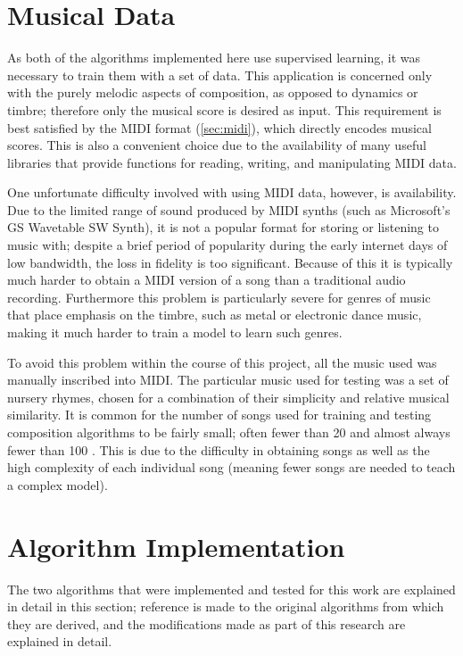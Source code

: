 \documentclass[ author={Stephen Livermore-Tozer},
				supervisor={Dr. Peter Flach},
				degree={MEng},
				title={Algorithmic Co-composition Using Machine Learning},
				subtitle={},
				type={research},
				year={2016} ]{dissertation}
\begin{document}
	\section{Musical Data}
	\label{sec:midi-data}
	
	As both of the algorithms implemented here use supervised learning, it was necessary to train them with a set of data. This application is concerned only with the purely melodic aspects of composition, as opposed to dynamics or timbre; therefore only the musical score is desired as input. This requirement is best satisfied by the MIDI format (\ref{sec:midi}), which directly encodes musical scores. This is also a convenient choice due to the availability of many useful libraries that provide functions for reading, writing, and manipulating MIDI data. 
	
	One unfortunate difficulty involved with using MIDI data, however, is availability. Due to the limited range of sound produced by MIDI synths (such as Microsoft's GS Wavetable SW Synth), it is not a popular format for storing or listening to music with; despite a brief period of popularity during the early internet days of low bandwidth, the loss in fidelity is too significant. Because of this it is typically much harder to obtain a MIDI version of a song than a traditional audio recording. Furthermore this problem is particularly severe for genres of music that place emphasis on the timbre, such as metal or electronic dance music, making it much harder to train a model to learn such genres. 
	
	To avoid this problem within the course of this project, all the music used was manually inscribed into MIDI. The particular music used for testing was a set of nursery rhymes, chosen for a combination of their simplicity and relative musical similarity. It is common for the number of songs used for training and testing composition algorithms to be fairly small; often fewer than 20 and almost always fewer than 100 \cite{todd1989connectionist,franklin2006recurrent}. This is due to the difficulty in obtaining songs as well as the high complexity of each individual song (meaning fewer songs are needed to teach a complex model).
		
	\section{Algorithm Implementation}
	\label{sec:implementation}
	
	The two algorithms that were implemented and tested for this work are explained in detail in this section; reference is made to the original algorithms from which they are derived, and the modifications made as part of this research are explained in detail. 
	
\end{document}
